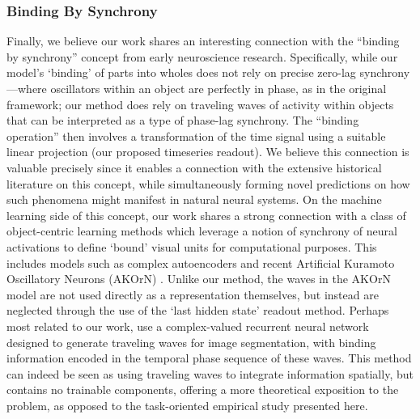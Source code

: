 \subsubsection{Binding By Synchrony}
Finally, we believe our work shares an interesting connection with the ``binding by synchrony'' concept \citep{Singer:2007} from early neuroscience research. Specifically, while our model's `binding' of parts into wholes does not rely on precise zero-lag synchrony—where oscillators within an object are perfectly in phase, as in the original framework; our method does rely on traveling waves of activity within objects that can be interpreted as a type of phase-lag synchrony. The ``binding operation'' then involves a transformation of the time signal using a suitable linear projection (our proposed timeseries readout). We believe this connection is valuable precisely since it enables a connection with the extensive historical literature on this concept, while simultaneously forming novel predictions on how such phenomena might manifest in natural neural systems. 
On the machine learning side of this concept, our work shares a strong connection with a class of object-centric learning methods which leverage a notion of synchrony of neural activations to define `bound' visual units for computational purposes. This includes models such as complex autoencoders \citep{lowe_complex-valued_2022, lowe_rotating_2024, stanic_contrastive_2024, gopalakrishnan_recurrent_2024} and recent Artificial Kuramoto Oscillatory Neurons (AKOrN) \cite{miyato_artificial_2024}. 
Unlike our method, the waves in the AKOrN model are not used directly as a representation themselves, but instead are neglected through the use of the `last hidden state' readout method. Perhaps most related to our work, \cite{liboni_image_2023} use a complex-valued recurrent neural network designed to generate traveling waves for image segmentation, with binding information encoded in the temporal phase sequence of these waves. This method can indeed be seen as using traveling waves to integrate information spatially, but contains no trainable components, offering a more theoretical exposition to the problem, as opposed to the task-oriented empirical study presented here. 